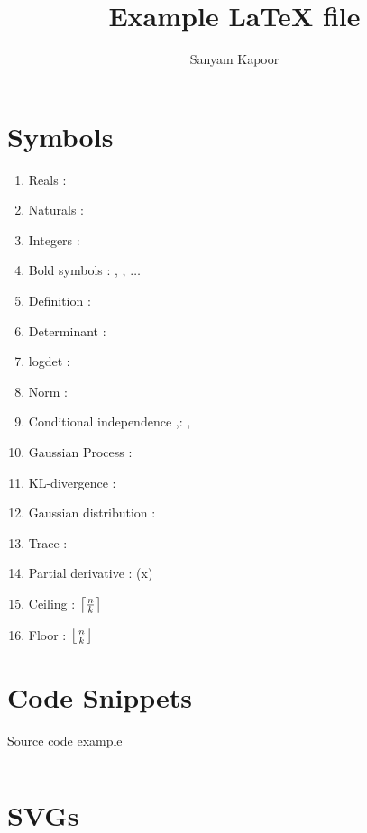 \documentclass{article}
\title{Example \LaTeX{ }file}
\author{Sanyam Kapoor}
\begin{document}
\maketitle

\section{Symbols}

\begin{enumerate}%
\item Reals \vrb{\reals}: \reals
\item Naturals \vrb{\naturals}: \naturals
\item Integers \vrb{\ints}: \ints
\item Bold symbols \vrb{\mbf{}}: \mbf{\Sigma}, , $\dots$
\item Definition : 
\item Determinant \vrb{\determ{}}: \determ{\cdot}
\item logdet \vrb{\logdet{}}: \logdet{\cdot}
\item Norm \vrb{\norm{}}: \norm{\cdot}
\item Conditional independence \vrb{\ci},\vrb{\nci}: \ci, \nci
\item Gaussian Process \vrb{\gp}: \gp
\item KL-divergence \vrb{\kl}: \kl
\item Gaussian distribution \vrb{\gaussian{}}: \gaussian{\cdot, \cdot}
\item Trace \vrb{\tr{}}: \tr{\cdot}
\item Partial derivative \vrb{\pd{}{}}: (x)
\item Ceiling : $\left\lceil \frac{n}{k} \right\rceil$
\item Floor : $\left\lfloor \frac{n}{k} \right\rfloor$
\end{enumerate}

\section{Code Snippets}

\begin{code}
\caption{Source code example} \label{code:sample}
\inputminted[firstline=1,lastline=2,fontsize=\small]{python}{test.py}
\end{code}

\section{SVGs}
\end{document}
